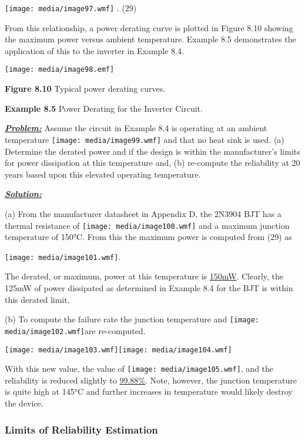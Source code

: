 \texttt{[image: media/image97.wmf]} . (29)

From this relationship, a power derating curve is plotted in Figure 8.10
showing the maximum power versus ambient temperature. Example 8.5
demonstrates the application of this to the inverter in Example 8.4.

\texttt{[image: media/image98.emf]}

\textbf{Figure 8.10} Typical power derating curves.

\textbf{Example 8.5} Power Derating for the Inverter Circuit.

\emph{\textbf{\ul{Problem:}}} Assume the circuit in Example 8.4 is
operating at an ambient temperature \texttt{[image: media/image99.wmf]}
and that no heat sink is used. (a) Determine the derated power and if
the design is within the manufacturer's limits for power dissipation at
this temperature and, (b) re-compute the reliability at 20 years based
upon this elevated operating temperature.

\emph{\textbf{\ul{Solution:}}}

(a) From the manufacturer datasheet in Appendix D, the 2N3904 BJT has a
thermal resistance of \texttt{[image: media/image100.wmf]} and a maximum
junction temperature of 150°C. From this the maximum power is computed
from (29) as

\texttt{[image: media/image101.wmf]}.

The derated, or maximum, power at this temperature is \ul{150mW}.
Clearly, the 125mW of power dissipated as determined in Example 8.4 for
the BJT is within this derated limit.

(b) To compute the failure rate the junction temperature and
\texttt{[image: media/image102.wmf]}are re-computed.

\texttt{[image: media/image103.wmf]}\texttt{[image: media/image104.wmf]}

With this new value, the value of \texttt{[image: media/image105.wmf]},
and the reliability is reduced slightly to \ul{99.88\%}. Note, however,
the junction temperature is quite high at 145°C and further increases in
temperature would likely destroy the device.

\subsubsection{Limits of Reliability
Estimation}\label{limits-of-reliability-estimation}

